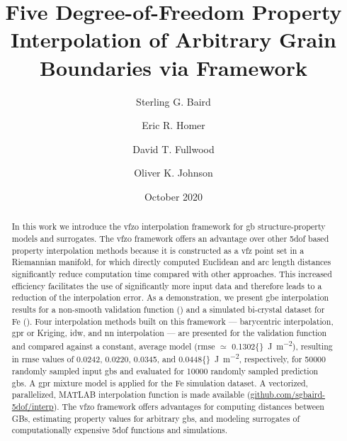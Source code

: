 \documentclass[final,twocolumn,12pt]{elsarticle}
\newcommand{\outpt}{prediction}
\newcommand{\baryrmse}{0.0242}
\newcommand{\gprrmse}{0.0220}
\newcommand{\idwrmse}{0.0345}
\newcommand{\nnrmse}{0.0448}
\newcommand{\avgrmse}{0.1302}
\begin{document}
\begin{frontmatter}

\title{Five Degree-of-Freedom Property Interpolation of Arbitrary Grain Boundaries via  Framework}

\author[myu]{Sterling G. Baird}
\author[myu]{Eric R. Homer}
\author[myu]{David T. Fullwood}
\author[myu]{Oliver K. Johnson}

\address[myu]{Department of Mechanical Engineering, Brigham Young University, Provo, UT 84602, USA}


\date{October 2020}

\begin{abstract}
    In this work we introduce the \gls{vfzo} interpolation framework for \gls{gb} structure-property models and surrogates. The \gls{vfzo} framework offers an advantage over other \gls{5dof} based property interpolation methods because it is constructed as a \gls{vfz} point set in a Riemannian manifold, for which directly computed Euclidean and arc length distances significantly reduce computation time compared with other approaches. This increased efficiency facilitates the use of significantly more input data and therefore leads to a reduction of the interpolation error. As a demonstration, we present \gls{gbe} interpolation results for a non-smooth validation function (\citet{bulatovGrainBoundaryEnergy2014}) and a simulated bi-crystal dataset for Fe (\citet{kimPhasefieldModeling3D2014}).
    Four interpolation methods built on this framework --- barycentric interpolation, \gls{gpr} or Kriging, \gls{idw}, and \gls{nn} interpolation --- are presented for the validation function and compared against a constant, average model (\gls{rmse} $\simeq$ \SI{\avgrmse{}}{\J\per\square\meter}), resulting in \gls{rmse} values of \baryrmse{}, \gprrmse{}, \idwrmse{}, and \SI{\nnrmse{}}{\J\per\square\meter},
    respectively, for \num{50000} randomly sampled input \glspl{gb} and evaluated for \num{10000} randomly sampled \outpt{} \glspl{gb}. A \gls{gpr} mixture model is applied for the Fe simulation dataset. A vectorized, parallelized, MATLAB interpolation function is made available (\url{github.com/sgbaird-5dof/interp}). The \gls{vfzo} framework offers advantages for computing distances between GBs, estimating property values for arbitrary \glspl{gb}, and modeling surrogates of computationally expensive \gls{5dof} functions and simulations.
\end{abstract}


\end{frontmatter}
\end{document}
